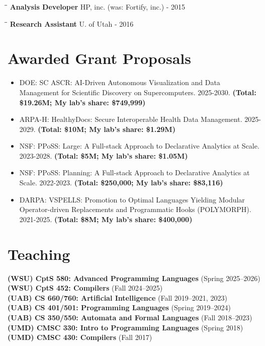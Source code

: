 \documentclass[line]{res}
\begin{document}
\begin{resume}
   \vspace{-0.2cm} 
   \begin{tabbing} 
    \hspace{2.25in}\= \hspace{2.25in}\= \kill 
    {\bf Analysis Developer} \>HP, inc. (was: Fortify, inc.)      - 2015 
   \end{tabbing}\vspace{-0.5cm}      
   \vspace{-0.2cm}   
   \begin{tabbing} 
    \hspace{2.25in}\= \hspace{2.25in}\= \kill 
    {\bf Research Assistant} \>U. of Utah       - 2016 
   \end{tabbing}\vspace{-0.5cm}      

\section{\large Awarded Grant Proposals} \vspace{0.15in}
\begin{itemize}[leftmargin=*]
  \item DOE: SC ASCR: AI-Driven Autonomous Visualization and Data Management for Scientific Discovery on Supercomputers. 2025-2030. \textbf{(Total: \$19.26M; My lab's share: \$749,999)}
  \item ARPA-H: HealthyDocs: Secure Interoperable Health Data Management. 2025-2029. \textbf{(Total: \$10M; My lab's share: \$1.29M)}
  \item NSF: PPoSS: Large: A Full-stack Approach to Declarative Analytics at Scale. 2023-2028. \textbf{(Total: \$5M; My lab's share: \$1.05M)}
  \item NSF: PPoSS: Planning: A Full-stack Approach to Declarative Analytics at Scale. 2022-2023. \textbf{(Total: \$250,000; My lab's share: \$83,116)}
  \item DARPA: VSPELLS: Promotion to Optimal Languages Yielding Modular Operator-driven Replacements and Programmatic Hooks (POLYMORPH). 2021-2025. \textbf{(Total: \$8M; My lab's share: \$400,000)}
\end{itemize}

\section{\large Teaching} \vspace{0.2in} 
\textbf{(WSU) CptS 580: Advanced Programming Languages} (Spring 2025--2026) \\ 
\textbf{(WSU) CptS 452: Compilers} (Fall 2024--2025) \\ 
\textbf{(UAB) CS 660/760: Artificial Intelligence} (Fall 2019--2021, 2023) \\ 
\textbf{(UAB) CS 401/501: Programming Languages} (Spring 2019--2024) \\  
\textbf{(UAB) CS 350/550: Automata and Formal Languages} (Fall 2018--2023) \\ 
\textbf{(UMD) CMSC 330: Intro to Programming Languages} (Spring 2018) \\ 
\textbf{(UMD) CMSC 430: Compilers} (Fall 2017) 


\end{resume}
\end{document}
